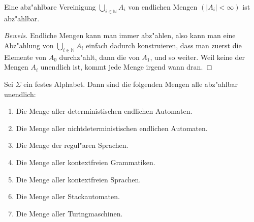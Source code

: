 \begin{satz}\label{countablefinite}
Eine abz"ahlbare Vereinigung $\bigcup_{i\in\mathbb N}A_i$ von endlichen
Mengen $(|A_i|<\infty)$ ist abz"ahlbar.
\end{satz}

\begin{proof}[Beweis]
Endliche Mengen kann man immer abz"ahlen, also kann man eine Abz"ahlung
von $\bigcup_{i\in\mathbb N}A_i$ einfach dadurch konstruieren, dass
man zuerst die Elemente von $A_0$ durchz"ahlt, dann die von $A_1$, und
so weiter. Weil keine der Mengen $A_i$ unendlich ist, kommt jede
Menge irgend wann dran.
\end{proof}

\begin{satz} Sei $\Sigma$ ein festes Alphabet. Dann sind die folgenden
Mengen alle abz"ahlbar unendlich:
\begin{enumerate}
\item Die Menge aller deterministischen endlichen Automaten.
\item Die Menge aller nichtdeterministischen endlichen Automaten.
\item Die Menge der regul"aren Sprachen.
\item Die Menge aller kontextfreien Grammatiken.
\item Die Menge aller kontextfreien Sprachen.
\item Die Menge aller Stackautomaten.
\item Die Menge aller Turingmaschinen.
\end{enumerate}
\end{satz}

